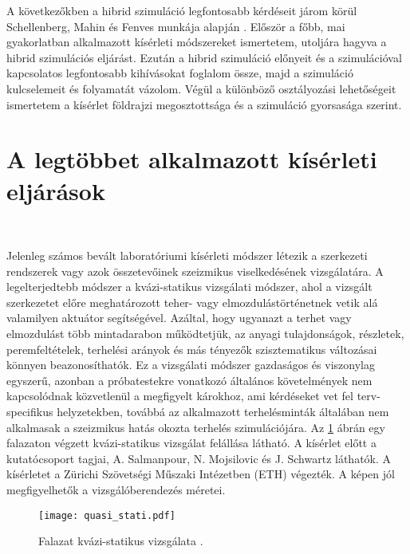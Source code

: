 A következőkben a hibrid szimuláció legfontosabb kérdéseit járom körül Schellenberg, Mahin és Fenves  munkája alapján \cite{hibrid}. Először a főbb, mai gyakorlatban alkalmazott kísérleti módszereket ismertetem, utoljára hagyva a hibrid szimulációs eljárást.   Ezután a hibrid szimuláció előnyeit és a szimulációval kapcsolatos legfontosabb kihívásokat foglalom össze, majd  a szimuláció kulcselemeit és folyamatát vázolom. Végül a különböző osztályozási lehetőségeit ismertetem a kísérlet földrajzi megosztottsága és a szimuláció gyorsasága szerint. 
 
\section{A legtöbbet alkalmazott kísérleti eljárások}

{\ }
 
Jelenleg számos bevált laboratóriumi kísérleti módszer létezik a szerkezeti rendszerek vagy azok összetevőinek szeizmikus  viselkedésének vizsgálatára. A legelterjedtebb módszer a kvázi-statikus vizsgálati módszer, ahol a vizsgált szerkezetet előre meghatározott teher- vagy elmozdulástörténetnek vetik alá valamilyen aktuátor segítségével. Azáltal, hogy ugyanazt a terhet vagy elmozdulást több mintadarabon működtetjük, az anyagi tulajdonságok, részletek, peremfeltételek, terhelési arányok és más tényezők szisztematikus változásai könnyen beazonosíthatók. Ez a vizsgálati módszer gazdaságos és viszonylag egyszerű, azonban  a   próbatestekre vonatkozó általános követelmények nem kapcsolódnak közvetlenül a megfigyelt károkhoz, ami kérdéseket vet fel terv-specifikus helyzetekben, továbbá az alkalmazott terhelésminták általában nem alkalmasak a szeizmikus hatás okozta terhelés szimulációjára. Az \ref{fig:quasi} ábrán egy falazaton végzett kvázi-statikus vizsgálat felállása látható.  A kísérlet előtt a kutatócsoport tagjai, A. Salmanpour, N.  Mojsilovic és J. Schwartz láthatók. A  kísérletet a Zürichi Szövetségi Műszaki Intézetben (ETH) végezték. A képen jól  megfigyelhetők a vizsgálóberendezés  méretei. 

\begin{figure}[h!bt]
\centering
\texttt{[image: quasi\_stati.pdf]}
\caption{Falazat kvázi-statikus vizsgálata \cite{quasi}.}
\label{fig:quasi}
\end{figure}


